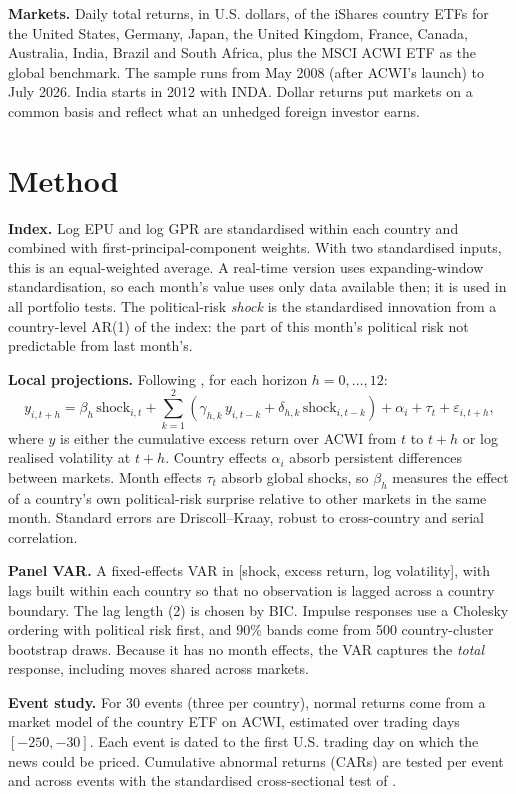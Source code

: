 \documentclass[11pt]{article}
\begin{document}
\textbf{Markets.} Daily total returns, in U.S. dollars, of the iShares country ETFs for the United States, Germany, Japan, the United Kingdom, France, Canada, Australia, India, Brazil and South Africa, plus the MSCI ACWI ETF as the global benchmark. The sample runs from May 2008 (after ACWI's launch) to July 2026. India starts in 2012 with INDA. Dollar returns put markets on a common basis and reflect what an unhedged foreign investor earns.

\section{Method}
\textbf{Index.} Log EPU and log GPR are standardised within each country and combined with first-principal-component weights. With two standardised inputs, this is an equal-weighted average. A real-time version uses expanding-window standardisation, so each month's value uses only data available then; it is used in all portfolio tests. The political-risk \emph{shock} is the standardised innovation from a country-level AR(1) of the index: the part of this month's political risk not predictable from last month's.

\textbf{Local projections.} Following \citet{jorda2005}, for each horizon $h = 0,\dots,12$:
\begin{equation}
y_{i,t+h} = \beta_h\, \text{shock}_{i,t} + \sum_{k=1}^{2}\left(\gamma_{h,k}\, y_{i,t-k} + \delta_{h,k}\, \text{shock}_{i,t-k}\right) + \alpha_i + \tau_t + \varepsilon_{i,t+h},
\end{equation}
where $y$ is either the cumulative excess return over ACWI from $t$ to $t+h$ or log realised volatility at $t+h$. Country effects $\alpha_i$ absorb persistent differences between markets. Month effects $\tau_t$ absorb global shocks, so $\beta_h$ measures the effect of a country's own political-risk surprise relative to other markets in the same month. Standard errors are Driscoll--Kraay, robust to cross-country and serial correlation.

\textbf{Panel VAR.} A fixed-effects VAR in [shock, excess return, log volatility], with lags built within each country so that no observation is lagged across a country boundary. The lag length (2) is chosen by BIC. Impulse responses use a Cholesky ordering with political risk first, and 90\% bands come from 500 country-cluster bootstrap draws. Because it has no month effects, the VAR captures the \emph{total} response, including moves shared across markets.

\textbf{Event study.} For 30 events (three per country), normal returns come from a market model of the country ETF on ACWI, estimated over trading days $[-250,-30]$. Each event is dated to the first U.S. trading day on which the news could be priced. Cumulative abnormal returns (CARs) are tested per event and across events with the standardised cross-sectional test of \citet{bmp1991}.
\end{document}
